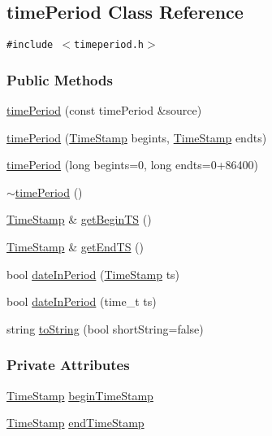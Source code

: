 \hypertarget{classtimePeriod}{
\subsection{time\-Period Class Reference}
\label{classtimePeriod}
}
{\tt \#include $<$timeperiod.h$>$}

\subsubsection*{Public Methods}
\begin{CompactItemize}
\item 
\hyperlink{classtimePeriod_timePerioda0}{time\-Period} (const time\-Period \&source)
\item 
\hyperlink{classtimePeriod_timePerioda1}{time\-Period} (\hyperlink{classTimeStamp}{Time\-Stamp} begints, \hyperlink{classTimeStamp}{Time\-Stamp} endts)
\item 
\hyperlink{classtimePeriod_timePerioda2}{time\-Period} (long begints=0, long endts=0+86400)
\item 
\hyperlink{classtimePeriod_timePerioda3}{$\sim$time\-Period} ()
\item 
\hyperlink{classTimeStamp}{Time\-Stamp} \& \hyperlink{classtimePeriod_timePerioda4}{get\-Begin\-TS} ()
\item 
\hyperlink{classTimeStamp}{Time\-Stamp} \& \hyperlink{classtimePeriod_timePerioda5}{get\-End\-TS} ()
\item 
bool \hyperlink{classtimePeriod_timePerioda6}{date\-In\-Period} (\hyperlink{classTimeStamp}{Time\-Stamp} ts)
\item 
bool \hyperlink{classtimePeriod_timePerioda7}{date\-In\-Period} (time\_\-t ts)
\item 
string \hyperlink{classtimePeriod_timePerioda8}{to\-String} (bool short\-String=false)
\end{CompactItemize}
\subsubsection*{Private Attributes}
\begin{CompactItemize}
\item 
\hyperlink{classTimeStamp}{Time\-Stamp} \hyperlink{classtimePeriod_timePeriodo0}{begin\-Time\-Stamp}
\item 
\hyperlink{classTimeStamp}{Time\-Stamp} \hyperlink{classtimePeriod_timePeriodo1}{end\-Time\-Stamp}
\end{CompactItemize}


